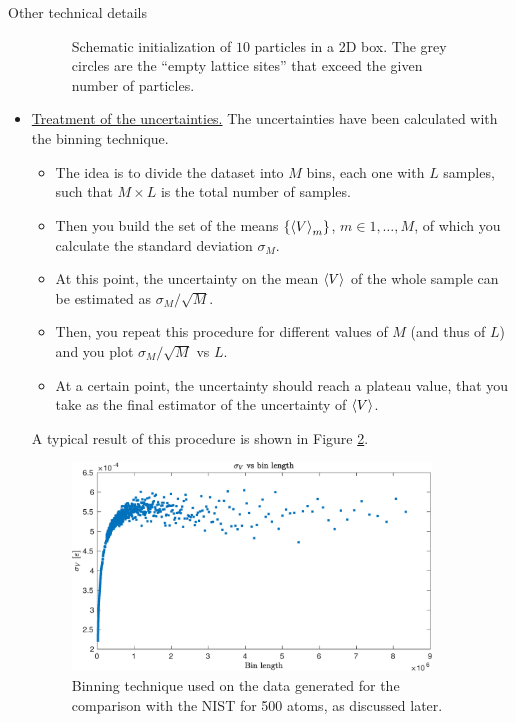 \documentclass[10pt, compress, protectframetitle, handout]{beamer}
\begin{document}
\begin{frame}[allowframebreaks]{Other technical details}
\begin{itemize}
\begin{figure}
			\caption{Schematic initialization of $10$ particles in a 2D box. The grey circles are the ``empty lattice sites'' that exceed the given number of particles.}
			\label{fig:initialization_scheme}
		\end{figure}
		\item \underline{Treatment of the uncertainties.} The uncertainties have been calculated with the \alert{binning technique}.
		\begin{itemize}
			\item The idea is to divide the dataset into $M$ bins, each one with $L$ samples, such that $M \times L$ is the total number of samples.
			\item Then you build the set of the means $\{\Braket{V}_m\}$, $m \in 1,\ldots,M$, of which you calculate the standard deviation $\sigma_M$.
			\item At this point, the uncertainty on the mean $\Braket{V}$ of the whole sample can be estimated as $\sigma_M/\sqrt{M}$.
			\item Then, you repeat this procedure for different values of $M$ (and thus of $L$) and you plot $\sigma_M/\sqrt{M}$ vs $L$.
			\item At a certain point, the uncertainty should reach a \alert{plateau} value, that you take as the final estimator of the uncertainty of $\Braket{V}$.
		\end{itemize}
		A typical result of this procedure is shown in Figure \ref{fig:binning_example}.
		\begin{figure}
			\centering
			\includegraphics[width=0.9\textwidth]{binning500_example}
			\caption{Binning technique used on the data generated for the comparison with the NIST for 500 atoms, as discussed later.}
			\label{fig:binning_example}
		\end{figure}
	\end{itemize}
\end{frame}
\end{document}
